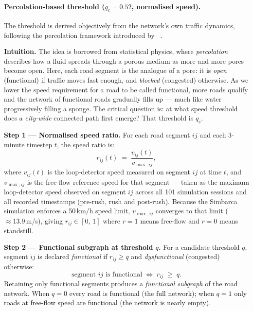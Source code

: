 \documentclass[11pt,a4paper]{article}
\begin{document}
\paragraph{Percolation-based threshold ($q_c = 0.52$, normalised speed).}

The threshold is derived objectively from the network's own traffic dynamics,
following the percolation framework introduced by
\citeauthor{li2015percolation}~\cite{li2015percolation}.

\medskip
\noindent\textbf{Intuition.}
The idea is borrowed from statistical physics, where \emph{percolation} describes
how a fluid spreads through a porous medium as more and more pores become open.
Here, each road segment is the analogue of a pore: it is \emph{open} (functional)
if traffic moves fast enough, and \emph{blocked} (congested) otherwise.  As we
lower the speed requirement for a road to be called functional, more roads qualify
and the network of functional roads gradually fills up --- much like water
progressively filling a sponge.  The critical question is: at what speed threshold
does a \emph{city-wide} connected path first emerge?  That threshold is $q_c$.

\medskip
\noindent\textbf{Step 1 --- Normalised speed ratio.}
For each road segment $ij$ and each 3-minute timestep $t$, the speed ratio is:
\begin{equation}
  r_{ij}(t) \;=\; \frac{v_{ij}(t)}{v_{\max,ij}},
  \label{eq:ratio}
\end{equation}
where $v_{ij}(t)$ is the loop-detector speed measured on segment $ij$ at time $t$,
and $v_{\max,ij}$ is the free-flow reference speed for that segment --- taken as
the maximum loop-detector speed observed on segment $ij$ across all 101 simulation
sessions and all recorded timestamps (pre-rush, rush and post-rush).  Because
the Simbarca simulation enforces a 50\,km/h speed limit, $v_{\max,ij}$ converges
to that limit ($\approx 13.9$\,m/s), giving $r_{ij} \in [0,\,1]$ where $r = 1$
means free-flow and $r = 0$ means standstill.

\medskip
\noindent\textbf{Step 2 --- Functional subgraph at threshold $q$.}
For a candidate threshold $q$, segment $ij$ is declared \emph{functional} if
$r_{ij} \geq q$ and \emph{dysfunctional} (congested) otherwise:
\begin{equation}
  \text{segment } ij \text{ is functional} \;\Longleftrightarrow\; r_{ij} \;\geq\; q.
\end{equation}
Retaining only functional segments produces a \emph{functional subgraph} of the
road network.  When $q = 0$ every road is functional (the full network); when
$q = 1$ only roads at free-flow speed are functional (the network is nearly empty).
\end{document}
